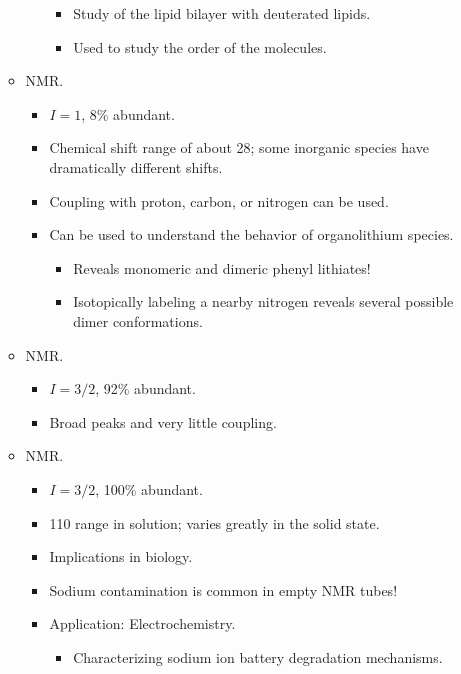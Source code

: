 \documentclass[../notes.tex]{subfiles}
\begin{document}
\begin{itemize}
\begin{itemize}
\begin{itemize}
            \begin{itemize}
                \item Study of the lipid bilayer with deuterated lipids.
                \item Used to study the order of the molecules.
            \end{itemize}
        \end{itemize}
        \item {} NMR.
        \begin{itemize}
            \item $I=1$, 8\% abundant.
            \item Chemical shift range of about \SI{28}{\partspermillion}; some inorganic species have dramatically different shifts.
            \item Coupling with proton, carbon, or nitrogen can be used.
            \item Can be used to understand the behavior of organolithium species.
            \begin{itemize}
                \item Reveals monomeric and dimeric phenyl lithiates!
                \item Isotopically labeling a nearby nitrogen reveals several possible dimer conformations.
            \end{itemize}
        \end{itemize}
        \item {} NMR.
        \begin{itemize}
            \item $I=3/2$, 92\% abundant.
            \item Broad peaks and very little coupling.
        \end{itemize}
        \item {} NMR.
        \begin{itemize}
            \item $I=3/2$, 100\% abundant.
            \item \SI{110}{\partspermillion} range in solution; varies greatly in the solid state.
            \item Implications in biology.
            \item Sodium contamination is common in empty NMR tubes!
            \item Application: Electrochemistry.
            \begin{itemize}
                \item Characterizing sodium ion battery degradation mechanisms.

\end{itemize}
\end{itemize}
\end{itemize}
\end{itemize}
\end{document}
